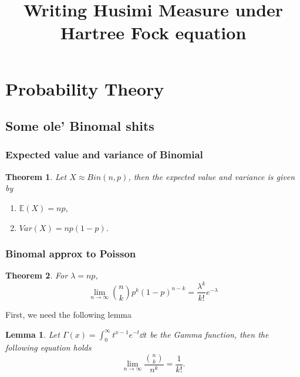\documentclass[10pt]{article}
\title{Writing Husimi Measure under Hartree Fock equation}
\date{}
\author{}
\theoremstyle{remark}
\theoremstyle{plain}
\newtheorem{Theorem}{Theorem}[section]
\newtheorem{Lemma}{Lemma}[section]
\numberwithin{equation}{section}
\begin{document}
\setcounter{secnumdepth}{5}

%
%
\section{Probability Theory}
\subsection{Some ole' Binomal shits}
\subsubsection{Expected value and variance of Binomial}
\begin{Theorem}\label{binom_exp_var}
	Let $X \approx Bin(n,p)$, then the expected value and variance is given by
	\begin{enumerate}
		\item $\mathbb{E}(X) = np$,
		\item $Var(X) = np(1-p)$.
	\end{enumerate}
\end{Theorem}
\subsubsection{Binomal approx to Poisson}
\begin{Theorem}\label{binom_approx_poisosn}
	For $\lambda = np $,
	$$ \lim_{n  \to \infty} \binom{n}{k} p^k {(1 - p)}^{n - k} = \frac {\lambda^k} {k!} e^{-\lambda}$$
\end{Theorem}

First, we need the following lemma
\begin{Lemma}\label{inf_binom_over_power}
	Let $\Gamma(x) = \int_0^\infty t^{x-1} e^{-t} \dd{t}$ be the Gamma function, then the following equation holds
	\[
		\lim_{n \to \infty} \frac{\binom{n}{k}}{n^k} = \frac{1}{k!}.
	\]
\end{Lemma}
\end{document}
